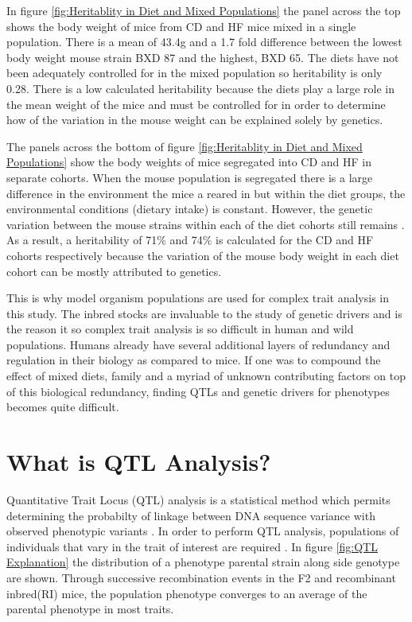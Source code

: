 \documentclass[a4paper,11pt,twoside]{book}
\begin{document}
     In figure \ref{fig:Heritablity in Diet and Mixed Populations} the panel across the top shows the body weight of mice from CD and HF mice mixed in a single population. There is a mean of 43.4g and a 1.7 fold difference between the lowest body weight mouse strain BXD 87 and the highest, BXD 65. The diets have not been adequately controlled for in the mixed population so heritability is only 0.28. There is a low calculated heritability because the diets play a large role in the mean weight of the mice and must be controlled for in order to determine how of the variation in the mouse weight can be explained solely by genetics\citep{GerhardAdam2012}.  
     
     The panels across the bottom of figure \ref{fig:Heritablity in Diet and Mixed Populations} show the body weights of mice segregated into CD and HF in separate cohorts. When the mouse population is segregated there is a large difference in the environment the mice a reared in but within the diet groups, the environmental conditions (dietary intake) is constant. However, the genetic variation between the mouse strains within each of the diet cohorts still remains \citep{GerhardAdam2012}. As a result, a heritability of 71\% and 74\% is calculated for the CD and HF cohorts respectively because the variation of the mouse body weight in each diet cohort can be mostly attributed to genetics. 
	
	This is why model organism populations are used for complex trait analysis in this study. The inbred stocks are invaluable to the study of genetic drivers and is the reason it so complex trait analysis is so difficult in human and wild populations. Humans already have several additional layers of redundancy and regulation in their biology as compared to mice\citep{Kafri2006Thecircuits}. If one was to compound the effect of mixed diets, family and a myriad of unknown contributing factors on top of this biological redundancy, finding QTLs and genetic drivers for phenotypes becomes quite difficult. 
	
	
	\section{What is QTL Analysis?}
	
	Quantitative Trait Locus (QTL) analysis is a statistical method which permits determining the probabilty of linkage between DNA sequence variance with observed phenotypic variants \citep{Falconer1996}. In order to perform QTL analysis, populations of individuals that vary in the trait of interest are required \citep{Mackay2009TheProspects}. In figure \ref{fig:QTL Explanation} the distribution of a phenotype parental strain along side genotype are shown. Through successive recombination events in the F2 and recombinant inbred(RI) mice, the population phenotype converges to an average of the parental phenotype in most traits. 
	
\end{document}
